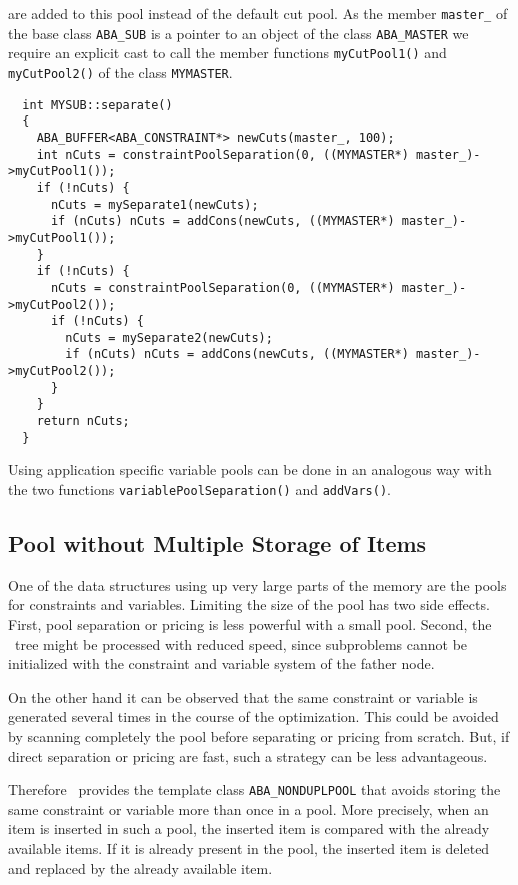 are added to this pool instead of the default cut pool. As the member
{\tt master\_} of the base class {\tt ABA\_SUB} is a pointer to an object
of the class {\tt ABA\_MASTER} we require an explicit cast to call the member
functions {\tt myCutPool1()} and {\tt myCutPool2()} of the class 
{\tt MYMASTER}.
\begin{verbatim}
  int MYSUB::separate()
  {
    ABA_BUFFER<ABA_CONSTRAINT*> newCuts(master_, 100);
    int nCuts = constraintPoolSeparation(0, ((MYMASTER*) master_)->myCutPool1());
    if (!nCuts) {
      nCuts = mySeparate1(newCuts);
      if (nCuts) nCuts = addCons(newCuts, ((MYMASTER*) master_)->myCutPool1());
    }
    if (!nCuts) {
      nCuts = constraintPoolSeparation(0, ((MYMASTER*) master_)->myCutPool2());
      if (!nCuts) {
        nCuts = mySeparate2(newCuts);
        if (nCuts) nCuts = addCons(newCuts, ((MYMASTER*) master_)->myCutPool2());
      }
    }
    return nCuts;
  }
\end{verbatim}
Using application specific variable pools can be done in an analogous
way with the two functions {\tt variablePoolSeparation()}
and {\tt addVars()}.

\subsection{Pool without Multiple Storage of Items}
\label{section:nonduplpool}

One of the data structures using up very large parts of the memory are
the pools for constraints and variables. Limiting the size of the pool
has two side effects. First, pool separation or pricing is less
powerful with a small pool. Second, the \bab\ tree might be processed
with reduced speed, since subproblems cannot be initialized with
the constraint and variable system of the father node. 

On the other hand it can be observed that the same constraint or
variable is generated several times in the course of the optimization.
This could be avoided by scanning completely the pool before separating
or pricing from scratch. But, if direct separation or pricing are
fast, such a strategy can be less advantageous.

Therefore \ABACUS\ provides the template class 
{\tt ABA\_NONDUPLPOOL}
that avoids storing the same
constraint or variable more than once in a pool. More precisely,
when an item is inserted in such a pool, the inserted item is compared
with the already available items. If it is already present in the
pool, the inserted item is deleted and replaced by the already
available item.

